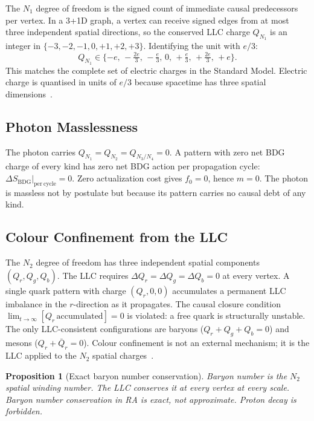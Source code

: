 \documentclass[11pt,a4paper]{article}
\newtheorem{proposition}[theorem]{Proposition}
\newcommand{\SBDG}{S_{\mathrm{BDG}}}
\begin{document}
The $N_1$ degree of freedom is the signed count of immediate causal
predecessors per vertex. In a 3+1D graph, a vertex can receive signed edges
from at most three independent spatial directions, so the conserved LLC
charge $Q_{N_1}$ is an integer in $\{-3, -2, -1, 0, +1, +2, +3\}$.
Identifying the unit with $e/3$:
\begin{equation}
  Q_{N_1} \in \{-e,\, -\tfrac{2e}{3},\, -\tfrac{e}{3},\, 0,\,
  +\tfrac{e}{3},\, +\tfrac{2e}{3},\, +e\}.
  \label{eq:charge_quant}
\end{equation}
This matches the complete set of electric charges in the Standard Model.
Electric charge is quantised in units of $e/3$ because spacetime has
three spatial dimensions~\citep{Sandeman2026RASM}.

\subsection{Photon Masslessness}

The photon carries $Q_{N_1} = Q_{N_2} = Q_{N_3/N_4} = 0$. A pattern with
zero net BDG charge of every kind has zero net BDG action per propagation
cycle: $\Delta\SBDG|_{\mathrm{per\ cycle}} = 0$. Zero actualization cost
gives $f_0 = 0$, hence $m = 0$. The photon is massless not by postulate
but because its pattern carries no causal debt of any kind.

\subsection{Colour Confinement from the LLC}

The $N_2$ degree of freedom has three independent spatial components
$(Q_r, Q_g, Q_b)$. The LLC requires $\Delta Q_r = \Delta Q_g =
\Delta Q_b = 0$ at every vertex. A single quark pattern with charge
$(Q_r, 0, 0)$ accumulates a permanent LLC imbalance in the $r$-direction
as it propagates. The causal closure condition
$\lim_{t\to\infty}[Q_r\,\mathrm{accumulated}] = 0$ is violated: a free
quark is structurally unstable. The only LLC-consistent configurations
are baryons ($Q_r + Q_g + Q_b = 0$) and mesons ($Q_r + \bar{Q}_r = 0$).
Colour confinement is not an external mechanism; it is the LLC applied
to the $N_2$ spatial charges~\citep{Sandeman2026RASM}.

\begin{proposition}[Exact baryon number conservation]
\label{prop:baryon}
Baryon number is the $N_2$ spatial winding number. The LLC conserves it
at every vertex at every scale. Baryon number conservation in RA is
exact, not approximate. Proton decay is forbidden.
\end{proposition}
\end{document}
